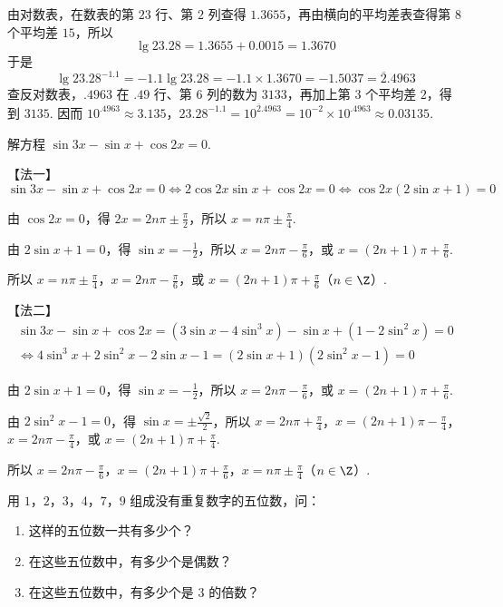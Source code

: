 \documentclass[UTF8,a4paper,oneside,11pt]{ctexbook}
\begin{document}
\begin{solution}
由对数表，在数表的第 \(23\) 行、第 \(2\) 列查得 \(1.3655\)，再由横向的平均差表查得第 \(8\) 个平均差 \(15\)，所以
\[
\lg 23.28=1.3655+0.0015=1.3670
\]
于是
\[
\lg 23.28^{-1.1}=-1.1\lg 23.28=-1.1\times1.3670=-1.5037
=\overline{2}.4963
\]
查反对数表，\(.4963\) 在 \(.49\) 行、第 \(6\) 列的数为 \(3133\)，再加上第 \(3\) 个平均差 \(2\)，得到 \(3135\). 因而
\(10^{.4963}\approx3.135\)，\(23.28^{-1.1}=10^{\overline{2}.4963} =10^{-2}\times10^{.4963}\approx0.03135\).
\end{solution}

\begin{problem}
解方程 \(\sin 3x-\sin x+\cos 2x=0\).
\end{problem}

\begin{solution}
【法一】
\[
\sin 3x-\sin x+\cos 2x=0
\Longleftrightarrow 2\cos 2x\sin x+\cos 2x=0
\Longleftrightarrow \cos 2x\left( 2\sin x+1 \right)=0
\]

由 \(\cos 2x=0\)，得 \(2x=2n\pi\pm\frac{\pi}{2}\)，所以 \(x=n\pi\pm\frac{\pi}{4}\).

由 \(2\sin x+1=0\)，得 \(\sin x=-\frac12\)，所以 \(x=2n\pi-\frac{\pi}{6}\)，或 \(x=\left( 2n+1 \right)\pi+\frac{\pi}{6}\).

所以 \(x=n\pi\pm\frac{\pi}{4}\)，\(x=2n\pi-\frac{\pi}{6}\)，或 \(x=\left( 2n+1 \right)\pi+\frac{\pi}{6}\)（\(n\in\Z\)）.

【法二】
\[
\begin{gathered}
\sin 3x-\sin x+\cos 2x
=\left( 3\sin x-4\sin^3x \right)-\sin x+\left( 1-2\sin^2x \right)=0\\
\Longleftrightarrow 4\sin^3x+2\sin^2x-2\sin x-1
=\left( 2\sin x+1 \right)\left( 2\sin^2x-1 \right)=0
\end{gathered}
\]

由 \(2\sin x+1=0\)，得 \(\sin x=-\frac12\)，所以 \(x=2n\pi-\frac{\pi}{6}\)，或 \(x=\left( 2n+1 \right)\pi+\frac{\pi}{6}\).

由 \(2\sin^2x-1=0\)，得 \(\sin x=\pm\frac{\sqrt2}{2}\)，所以 \(x=2n\pi+\frac{\pi}{4}\)，\(x=\left( 2n+1 \right)\pi-\frac{\pi}{4}\)，\(x=2n\pi-\frac{\pi}{4}\)，或 \(x=\left( 2n+1 \right)\pi+\frac{\pi}{4}\).

所以 \(x=2n\pi-\frac{\pi}{6}\)，\(x=\left( 2n+1 \right)\pi+\frac{\pi}{6}\)，\(x=n\pi\pm\frac{\pi}{4}\)（\(n\in\Z\)）.
\end{solution}

\begin{problem}
用 \(1\)，\(2\)，\(3\)，\(4\)，\(7\)，\(9\) 组成没有重复数字的五位数，问：

\begin{enumerate}
\item 这样的五位数一共有多少个？
\item 在这些五位数中，有多少个是偶数？
\item 在这些五位数中，有多少个是 \(3\) 的倍数？
\end{enumerate}
\end{problem}
\end{document}
